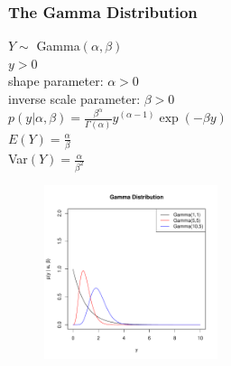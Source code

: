 \documentclass[handout]{beamer}
\begin{document}
\begin{frame}
\frametitle{The Gamma Distribution}
\pause
\begin{multicols}{2}
$Y \sim$ Gamma$(\alpha, \beta)$\\
\bigskip
\pause
$y > 0$\\
\bigskip
\pause
shape parameter: $\alpha > 0$\\
\pause
inverse scale parameter: $\beta > 0$ \\
\bigskip
\pause
$p(y| \alpha, \beta) = \frac{\beta^{\alpha}}{\Gamma (\alpha)}
y^{(\alpha - 1)} \exp{(-\beta y)}$\\
\bigskip
\bigskip
\pause
$E(Y) = \frac{\alpha}{\beta}$\\
\bigskip
\pause
Var$(Y) = \frac{\alpha}{\beta^2}$


\begin{figure}[!htp]
\begin{center}
\includegraphics[width=2in, height=2in]{probability-gamma.pdf}
\end{center}
\end{figure}
\end{multicols}
\end{frame}
\end{document}
